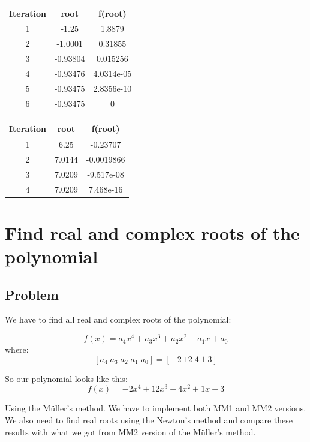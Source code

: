 \documentclass[12pt]{report}
\begin{document}
\begin{center}
  \begin{tabular}{| c  c c |}
\hline
Iteration & root         & f(root) \\
\hline
1   &      -1.25   &      1.8879  \\
\hline
2   &    -1.0001   &     0.31855  \\
\hline
3   &   -0.93804   &    0.015256  \\
\hline
4   &   -0.93476   &  4.0314e-05  \\
\hline
5   & -0.93475    & 2.8356e-10  \\
\hline
6   &   -0.93475   &           0  \\
\hline
\hline

\hline
\end{tabular}
\end{center}

\begin{center}
  \begin{tabular}{| c  c c |}
\hline
Iteration & root         & f(root) \\
\hline
1   &     6.25    &   -0.23707  \\
\hline
2    &  7.0144    & -0.0019866 \\
\hline
3     & 7.0209    & -9.517e-08  \\
\hline
4      &7.0209    &  7.468e-16  \\
\hline
\hline

\hline
\end{tabular}
\end{center}


\chapter{Find real and complex roots of the polynomial}

\section{Problem}

We have to find all real and complex roots of the polynomial:

\[ f(x) = a_4x^4+a_3x^3+a_2x^2+a_1x+a_0 \]
where:
\[ [a_4 \; a_3 \; a_2 \; a_1 \; a_0] = [-2 \; 12 \; 4 \; 1 \; 3] \]

So our polynomial looks like this:
\[ f(x) = -2x^4+12x^3+4x^2+1x+3 \]

Using the M{\"u}ller's method. We have to implement both MM1 and MM2 versions. We also need to find real roots using the Newton's method and compare these results with what we got from MM2 version of the M{\"u}ller's method.
\end{document}
